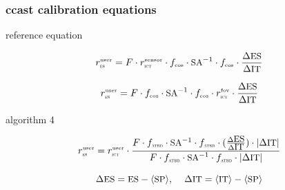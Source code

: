 \documentclass[11pt]{beamer}
\begin{document}
\begin{frame}
\frametitle{ccast calibration equations}


\begin{center}
{\ccast} reference equation
\end{center}
\vspace{-2mm}
\begin{equation}
  \rESuser = F \cdot \rITsensor \cdot \fcos \cdot \SA^{-1}\cdot \fcos 
         \cdot \frac{\Delta\ES}{\Delta\IT}
\end{equation}

\begin{equation}
  \rESuser = F \cdot \fcos \cdot \SA^{-1}\cdot \fcos \cdot \rITfov 
         \cdot \frac{\Delta\ES}{\Delta\IT}
\end{equation}

\vspace{3mm}
\begin{center}
{\noaa} algorithm 4
\end{center}
\vspace{-2mm}
\begin{equation}
  \rESuser = \rITuser \cdot
         \frac{F \cdot \fatbd \cdot \SA^{-1}\cdot \fatbd \cdot 
                  (\frac{\Delta\ES}{\Delta\IT}) \cdot {|\Delta\IT|}}
              {F \cdot \fatbd \cdot \SA^{-1}\cdot \fatbd \cdot {|\Delta\IT|}}
\end{equation}

\vspace{3mm}
\[ \Delta\ES = \ES - \SPmean, \hspace{4mm}
   \Delta\IT = \ITmean - \SPmean \]

\end{frame}
\end{document}
